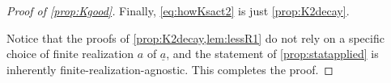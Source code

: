 \documentclass[
	fontsize=11pt, 
	twoside=false, 
	abstract=true, 
	a4paper,
]{scrartcl}
\newcommand{\eps}{\varepsilon}
\newcommand{\ud}[1]{\underline{#1}}
\begin{document}
\begin{proof}[Proof of \cref{prop:Kgood}]

	Finally, \cref{eq:howKsact2} is just \cref{prop:K2decay}. %

	Notice that the proofs of \cref{prop:K2decay,lem:lessR1} do not rely on a specific choice of finite realization $a$ of $\ud{a}$, and the statement of \cref{prop:statapplied} is inherently finite-realization-agnostic. This completes the proof. 
\end{proof}
\end{document}
